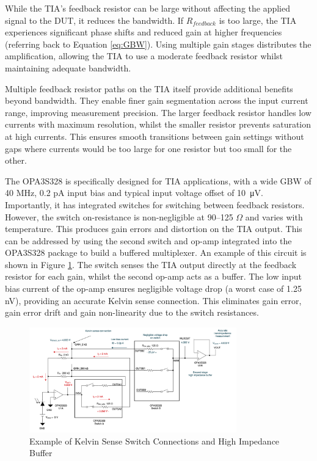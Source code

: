 While the \ac{TIA}'s feedback resistor can be large without affecting the applied signal to the \ac{DUT}, it reduces the bandwidth. If $R_{feedback}$ is too large, the \ac{TIA} experiences significant phase shifts and reduced gain at higher frequencies (referring back to Equation \ref{eq:GBW}). Using multiple gain stages distributes the amplification, allowing the \ac{TIA} to use a moderate feedback resistor whilst maintaining adequate bandwidth.

Multiple feedback resistor paths on the \ac{TIA} itself provide additional benefits beyond bandwidth. They enable finer gain segmentation across the input current range, improving measurement precision. The larger feedback resistor handles low currents with maximum resolution, whilst the smaller resistor prevents saturation at high currents. This ensures smooth transitions between gain settings without gaps where currents would be too large for one resistor but too small for the other.

The OPA3S328 is specifically designed for \ac{TIA} applications, with a wide GBW of 40 MHz, 0.2 pA input bias and typical input voltage offset of \SI{10}{\micro\volt}. Importantly, it has integrated switches for switching between feedback resistors. However, the switch on-resistance is non-negligible at 90--125 $\Omega$ and varies with temperature. This produces gain errors and distortion on the \ac{TIA} output. This can be addressed by using the second switch and op-amp integrated into the OPA3S328 package to build a buffered multiplexer. An example of this circuit is shown in Figure \ref{fig:kelvin_sense_tia}. The switch senses the \ac{TIA} output directly at the feedback resistor for each gain, whilst the second op-amp acts as a buffer. The low input bias current of the op-amp ensures negligible voltage drop (a worst case of 1.25 nV), providing an accurate Kelvin sense connection. This eliminates gain error, gain error drift and gain non-linearity due to the switch resistances.

\begin{figure}[]
    \centering
    \includegraphics[width=0.8\textwidth]{KelvinSenseTIA.png}
    \caption[Example of Kelvin Sense Switch Connections and High Impedance Buffer]{Example of Kelvin Sense Switch Connections and High Impedance Buffer\cite{chioyeBuildProgrammableGain2021}}
    \label{fig:kelvin_sense_tia}
\end{figure}

